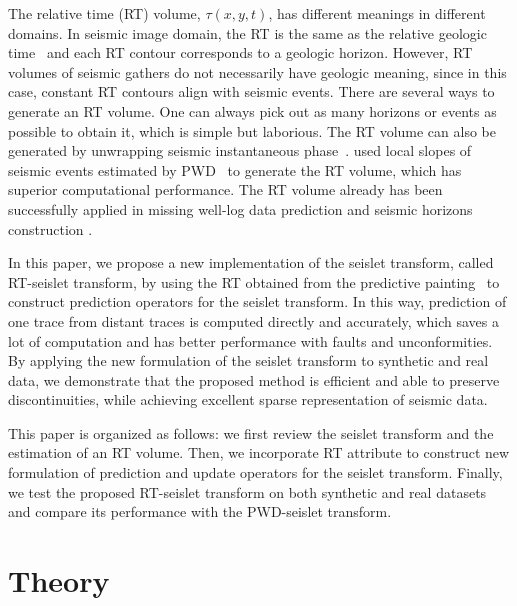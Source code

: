     The relative time (RT) volume, $\tau(x,y,t)$, has different meanings in
    different domains. 
    In seismic image domain, the RT is the same as the relative geologic 
    time~\cite[]{stark2003unwrapping, stark2004relative} and each RT contour 
    corresponds to a geologic horizon.
    However, RT volumes of seismic gathers do not necessarily have geologic 
    meaning, since in this case, constant RT contours align with seismic events.
    There are several ways to generate an RT volume. 
    One can always pick out as many horizons or events as possible to obtain it, 
    which is simple but laborious. 
    The RT volume can also be generated by unwrapping seismic instantaneous 
    phase~\cite[]{stark2003unwrapping, wu2012generating}.
    \cite{fomel2010predictive} used local slopes of seismic events estimated by 
    PWD~\cite[]{fomel2002applications} to generate the RT volume, which has 
    superior computational performance. 
    The RT volume already has been successfully applied in missing well-log 
    data prediction \cite[]{bader2018missing} and seismic horizons construction 
    \cite[]{wu2015horizon}.
    
    In this paper, we propose a new implementation of the seislet transform, 
    called RT-seislet transform, by using the RT obtained from the predictive 
    painting~\cite[]{fomel2010predictive} to construct prediction operators for 
    the seislet transform. 
    In this way, prediction of one trace from distant traces is computed 
    directly and accurately, which saves a lot of computation and has better 
    performance with faults and unconformities.
    By applying the new formulation of the seislet transform to synthetic and 
    real data, we demonstrate that the proposed method is efficient and able to 
    preserve discontinuities, while achieving excellent sparse representation of 
    seismic data. 

    This paper is organized as follows: we first review the seislet 
    transform and the estimation of an RT volume. 
    Then, we incorporate RT attribute to construct new formulation of prediction 
    and update operators for the seislet transform.
    Finally, we test the proposed RT-seislet transform on both synthetic and 
    real datasets and compare its performance with the PWD-seislet transform.
    
\section{Theory}
